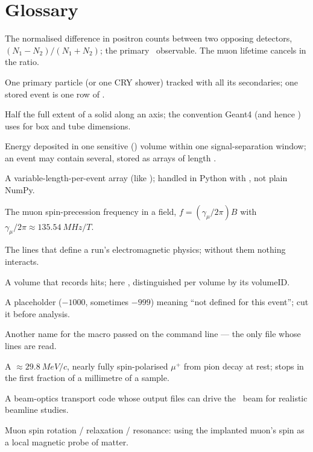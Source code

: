 \chapter{Glossary}
\label{app:glossary}
\begin{description}[style=nextline,leftmargin=0pt,itemsep=0.45em,font=\sffamily\bfseries\color{navy}]
\item[Asymmetry] The normalised difference in positron counts between two opposing detectors, \((N_1-N_2)/(N_1+N_2)\); the primary \muSR\ observable. The muon lifetime cancels in the ratio.
\item[Event] One primary particle (or one CRY shower) tracked with all its secondaries; one stored event is one row of .
\item[Half-length] Half the full extent of a solid along an axis; the convention Geant4 (and hence ) uses for box and tube dimensions.
\item[Hit] Energy deposited in one sensitive () volume within one signal-separation window; an event may contain several, stored as arrays of length .
\item[Jagged array] A variable-length-per-event array (like ); handled in Python with , not plain NumPy.
\item[Larmor frequency] The muon spin-precession frequency in a field, \(f=(\gamma_\mu/2\pi)B\) with \(\gamma_\mu/2\pi\approx\SI{135.54}{MHz/T}\).
\item[Physics block] The  lines that define a run's electromagnetic physics; without them nothing interacts.
\item[Sensitive detector] A volume that records hits; here , distinguished per volume by its volumeID.
\item[Sentinel value] A placeholder (\(-1000\), sometimes \(-999\)) meaning ``not defined for this event''; cut it before analysis.
\item[Steering file] Another name for the macro passed on the command line --- the only file whose  lines are read.
\item[Surface muon] A \(\approx\SI{29.8}{MeV/c}\), nearly fully spin-polarised \(\mu^+\) from pion decay at rest; stops in the first fraction of a millimetre of a sample.
\item[TURTLE] A beam-optics transport code whose output files can drive the \musrSim\ beam for realistic beamline studies.
\item[\texorpdfstring{\(\mu\)SR}{muSR}] Muon spin rotation / relaxation / resonance: using the implanted muon's spin as a local magnetic probe of matter.
\end{description}
